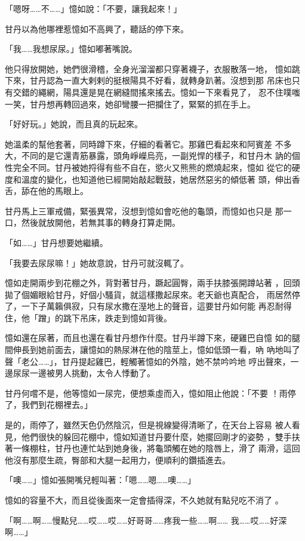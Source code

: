 「嗯呀……不……」憶如說：「不要，讓我起來！」

甘丹以為他哪裡惹憶如不高興了，聽話的停下來。

「我……我想尿尿。」憶如嘟著嘴說。

他只得放開她，她們很滑稽，全身光溜溜都只穿著襪子，衣服散落一地，
憶如跳下來，甘丹認為一直大剌剌的挺根陽具不好看，就轉身趴著。沒想到那
吊床也只有交錯的繩網，陽具還是晃在網縫間搖來搖去。憶如一下來看見了，
忍不住噗嗤一笑，甘丹想再轉回過來，她卻彎腰一把攔住了，緊緊的抓在手上。

「好好玩。」她說，而且真的玩起來。

她溫柔的幫他套著，同時蹲下來，仔細的看著它。那雞巴看起來和阿賓差
不多大，不同的是它還青筋暴露，頭角崢嶸烏亮，一副兇悍的樣子，和甘丹木
訥的個性完全不同。甘丹被她捋得有些不自在，慾火又熊熊的燃燒起來，憶如
從它的硬度和溫度的變化，也知道他已經開始敲起戰鼓，她居然惡劣的傾低著
頭，伸出香舌，舔在他的馬眼上。

甘丹馬上三軍戒備，緊張異常，沒想到憶如會吃他的龜頭，而憶如也只是
那一口，然後就放開他，若無其事的轉身打算走開。

「如……」甘丹想要她繼續。

「我要去尿尿嘛！」她故意說，甘丹可就沒輒了。

憶如走開兩步到花棚之外，背對著甘丹，蹶起圓臀，兩手扶膝張開蹲站著
，回頭拋了個媚眼給甘丹，好個小騷貨，就這樣撒起尿來。老天爺也真配合，
雨居然停了，一下子萬籟俱寂，只有尿水撒在溼地上的聲音，這要甘丹如何能
再忍耐得住，他「蹭」的跳下吊床，跌走到憶如背後。

憶如還在尿著，而且也還在看甘丹想作什麼。甘丹半蹲下來，硬雞巴自憶
如的腿間伸長到她前面去，讓憶如的熱尿淋在他的陰莖上，憶如低頭一看，吶
吶地叫了聲「老公……」，甘丹提起雞巴，輕觸著憶如的外陰，她不禁吟吟地
哼出聲來，一邊尿尿一邊被男人挑動，太令人悸動了。

甘丹何嚐不是，他等憶如一尿完，便想乘虛而入，憶如阻止他說：「不要
！雨停了，我們到花棚裡去。」

是的，雨停了，雖然天色仍然陰沉，但是視線變得清晰了，在天台上容易
被人看見，他們很快的躲回花棚中，憶如知道甘丹要什麼，她擺回剛才的姿勢
，雙手扶著一條棚柱，甘丹也連忙站到她身後，將龜頭觸在她的陰唇上，滑了
兩滑，這回他沒有那麼生疏，臀部和大腿一起用力，便順利的鑽插進去。

「噢……」憶如張開嘴兒輕叫著：「嗯……嗯……噢……」

憶如的容量不大，而且從後面來一定會插得深，不久她就有點兒吃不消了
。

「啊……啊……慢點兒……哎……哎……好哥哥……疼我一些……啊……
我……哎……好深啊……」

